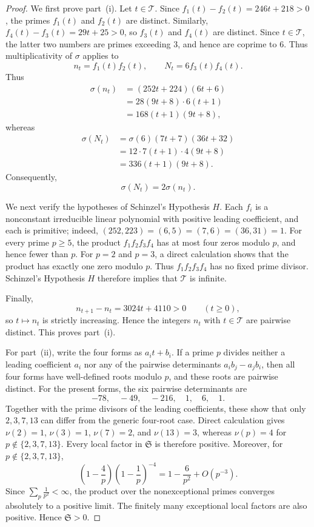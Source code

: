 \documentclass[11pt,reqno]{amsart}
\numberwithin{equation}{section}
\theoremstyle{plain}
\theoremstyle{definition}
\theoremstyle{remark}
\begin{document}
\begin{proof}
We first prove part~(i). Let $t\in\mathcal T$. Since
$f_1(t)-f_2(t)=246t+218>0$, the primes $f_1(t)$ and $f_2(t)$ are
distinct. Similarly, $f_4(t)-f_3(t)=29t+25>0$, so $f_3(t)$ and
$f_4(t)$ are distinct. Since $t\in\mathcal T$, the latter two
numbers are primes exceeding $3$, and hence are coprime to $6$.
Thus multiplicativity of $\sigma$ applies to
\[
n_t=f_1(t)f_2(t),
\qquad
N_t=6f_3(t)f_4(t).
\] Thus
\[
\begin{aligned}
\sigma(n_t)
&=(252t+224)(6t+6)\\
&=28(9t+8)\cdot6(t+1)\\
&=168(t+1)(9t+8),
\end{aligned}
\]
whereas
\[
\begin{aligned}
\sigma(N_t)
&=\sigma(6)(7t+7)(36t+32)\\
&=12\cdot7(t+1)\cdot4(9t+8)\\
&=336(t+1)(9t+8).
\end{aligned}
\]
Consequently,
\begin{equation}\label{eq:multiplier-two}
\sigma(N_t)=2\sigma(n_t).
\end{equation}

We next verify the hypotheses of Schinzel's Hypothesis $H$. Each
$f_i$ is a nonconstant irreducible linear polynomial with positive
leading coefficient, and each is primitive; indeed,
$(252,223)=(6,5)=(7,6)=(36,31)=1$. For every prime $p\ge5$, the
product $f_1f_2f_3f_4$ has at most four zeros modulo $p$, and hence
fewer than $p$. For $p=2$ and $p=3$, a direct calculation shows that
the product has exactly one zero modulo $p$. Thus $f_1f_2f_3f_4$ has no
fixed prime divisor. Schinzel's Hypothesis $H$ therefore implies that $\mathcal T$ is infinite.

Finally,
\[
n_{t+1}-n_t=3024t+4110>0\qquad(t\ge0),
\]
so $t\mapsto n_t$ is strictly increasing. Hence the integers $n_t$ with $t\in\mathcal T$ are pairwise distinct. This proves part~(i).

For part~(ii), write the four forms as $a_it+b_i$. If a prime $p$ divides neither a leading coefficient $a_i$ nor any of the pairwise determinants $a_ib_j-a_jb_i$, then all four forms have well-defined roots modulo $p$, and these roots are pairwise distinct. For the present forms, the six pairwise determinants are
\[
-78,\quad-49,\quad-216,\quad1,\quad6,\quad1.
\]
Together with the prime divisors of the leading coefficients, these
show that only $2,3,7,13$ can differ from the generic four-root case. Direct calculation gives
$\nu(2)=1$, $\nu(3)=1$, $\nu(7)=2$, and $\nu(13)=3$, whereas
$\nu(p)=4$ for $p\notin\{2,3,7,13\}$.
Every local factor in $\mathfrak S$ is therefore positive. Moreover, for $p\notin\{2,3,7,13\}$,
\[
\left(1-\frac4p\right)\left(1-\frac1p\right)^{-4}
=
1-\frac6{p^2}+O(p^{-3}).
\]
Since $\sum_p\frac1{p^2}<\infty$, the product over the nonexceptional primes converges absolutely to a positive limit. The finitely many exceptional local factors are also positive. Hence $\mathfrak S>0$.


\end{proof}
\end{document}
